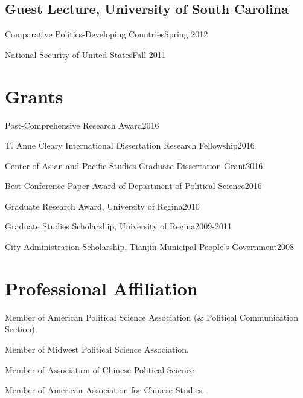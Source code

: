 \documentclass[10.5pt,]{article}
\providecommand{\tightlist}{%
	\setlength{\itemsep}{0pt}\setlength{\parskip}{0pt}}
\renewenvironment{itemize}{
	\begin{list}{}{
			\setlength{\leftmargin}{1.5em}
		}
	}{
	\end{list}
}
\begin{document}
\subsection{Guest Lecture, University of South
Carolina}\label{guest-lecture-university-of-south-carolina}

\begin{itemize}
\tightlist
\item
  Comparative Politics-Developing Countries\hfill Spring 2012
\item
  National Security of United States\hfill Fall 2011
\end{itemize}

\section{Grants}\label{grants}

\begin{itemize}
\tightlist
\item
  Post-Comprehensive Research Award\hfill 2016
\item
  T. Anne Cleary International Dissertation Research
  Fellowship\hfill 2016
\item
  Center of Asian and Pacific Studies Graduate Dissertation
  Grant\hfill 2016
\item
  Best Conference Paper Award of Department of Political
  Science\hfill 2016
\item
  Graduate Research Award, University of Regina\hfill 2010
\item
  Graduate Studies Scholarship, University of Regina\hfill 2009-2011
\item
  City Administration Scholarship, Tianjin Municipal People's
  Government\hfill 2008
\end{itemize}

\section{Professional Affiliation}\label{professional-affiliation}

\begin{itemize}
\tightlist
\item
  Member of American Political Science Association (\& Political
  Communication Section).
\item
  Member of Midwest Political Science Association.
\item
  Member of Association of Chinese Political Science
\item
  Member of American Association for Chinese Studies.
\end{itemize}
\end{document}
